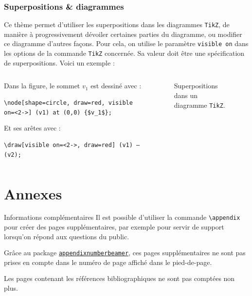 \documentclass[10pt,    %
    french,             %
    xcolor=table,       %
    envcountsect,       %
    aspectratio=43      %
]{beamer}
\begin{document}
\begin{frame}
    \label{sli:Diagrammes}
    \frametitle{Superpositions \& diagrammes}
    Ce thème permet d'utiliser les superpositions dans les diagrammes \texttt{TikZ}, de manière à progressivement dévoiler certaines parties du diagramme, ou modifier ce diagramme d'autres façons. Pour cela, on utilise le paramètre \texttt{visible on} dans les options de la commande \texttt{TikZ} concernée. Sa valeur doit être une spécification de superpositions. Voici un exemple :
    
    \begin{columns}[totalwidth=\textwidth]
        \begin{column}{0.49\textwidth}
            Dans la figure, le sommet $v_1$ est dessiné avec :

            \texttt{\textbackslash{}node[shape=circle, draw=red, \alert{visible on=<2->}] (v1) at (0,0) \{\$v\_1\$\};}
            
            \medskip
            Et ses arêtes avec :
	        
	        \texttt{\textbackslash{}draw[\alert{visible on=<2->}, draw=red] (v1) -- (v2);}
        \end{column}
        \begin{column}{0.49\textwidth}
            \begin{figure}[H]
                \centering
                \resizebox{0.6\linewidth}{!}{}
                \caption{Superpositions dans un diagramme \texttt{TikZ}.}
                \label{fig:overlays}
            \end{figure}
        \end{column}
    \end{columns}
\end{frame}












\appendix
\section{Annexes}
\sectionframe

\begin{frame}{Informations complémentaires}
	Il est possible d'utiliser la commande \texttt{\textbackslash{}appendix} pour créer des pages supplémentaires, par exemple pour servir de support lorsqu'on répond aux questions du public. 
	
    \medskip
	Grâce au package \href{https://ctan.org/pkg/appendixnumberbeamer?lang=en}{\texttt{appendixnumberbeamer}}, ces pages supplémentaires ne sont pas prises en compte dans le numéro de page affiché dans le pied-de-page.
	
    \medskip
	Les pages contenant les références bibliographiques ne sont pas comptées non plus.
\end{frame}
\end{document}
